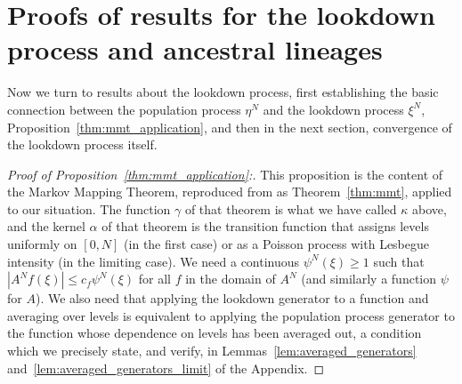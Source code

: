 \documentclass[EJP]{ejpecp} %
\newcommand{\lp}{\xi}              %
\newcommand{\citet}[1]{\cite{#1}}
\begin{document}
\section{Proofs of results for the lookdown process and ancestral lineages}
    \label{sec:lookdown_proofs}

Now we turn to results about the lookdown process,
first establishing the basic connection between the population process $\eta^N$
and the lookdown process $\lp^N$,
Proposition~\ref{thm:mmt_application},
and then in the next section, convergence of the lookdown process itself.

\begin{proof}[Proof of Proposition~\ref{thm:mmt_application}:]
    This proposition is the content of the Markov Mapping Theorem,
    reproduced from \citet{etheridge/kurtz:2019} as Theorem~\ref{thm:mmt},
    applied to our situation.
    The function $\gamma$ of that theorem is what we have called $\kappa$ above,
    and the kernel $\alpha$ of that theorem
    is the transition function that assigns levels uniformly on $[0, N]$ (in the first case)
    or as a Poisson process with Lesbegue intensity (in the limiting case).
    We need a continuous $\psi^N(\lp) \ge 1$ such that $|A^N f(\lp)| \le c_f \psi^N(\lp)$
    for all $f$ in the domain of $A^N$ (and similarly a function $\psi$ for $A$).
    We also need that applying the lookdown generator to a function and averaging over levels
    is equivalent to applying the population process generator to the function
    whose dependence on levels has been averaged out,
    a condition which we precisely state, and verify,
    in Lemmas~\ref{lem:averaged_generators} and~\ref{lem:averaged_generators_limit}
    of the Appendix.


\end{proof}
\end{document}
